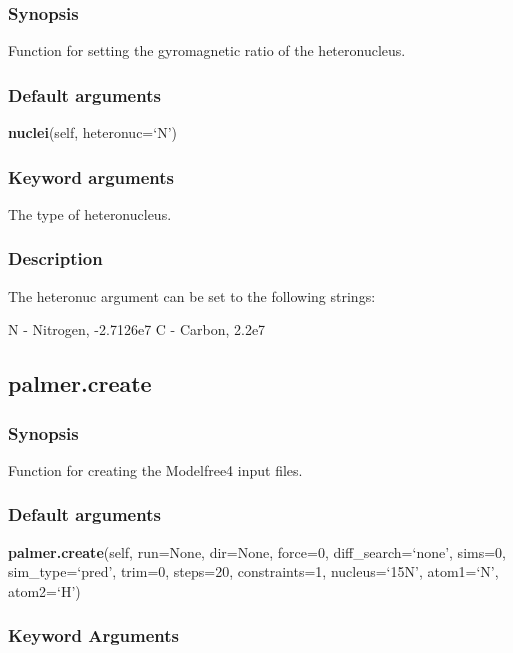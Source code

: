 \subsubsection{Synopsis}

Function for setting the gyromagnetic ratio of the heteronucleus.

\subsubsection{Default arguments}

\textsf{\textbf{nuclei}(self, heteronuc=`N')}


\subsubsection{Keyword arguments}

  The type of heteronucleus.

\subsubsection{Description}

The heteronuc argument can be set to the following strings:

    N - Nitrogen, -2.7126e7
    C - Carbon, 2.2e7


\newpage

\subsection{palmer.create}


\subsubsection{Synopsis}

Function for creating the Modelfree4 input files.

\subsubsection{Default arguments}

\textsf{\textbf{palmer.create}(self, run=None, dir=None, force=0, diff\_search=`none', sims=0, sim\_type=`pred', trim=0, steps=20, constraints=1, nucleus=`15N', atom1=`N', atom2=`H')}


\subsubsection{Keyword Arguments}

